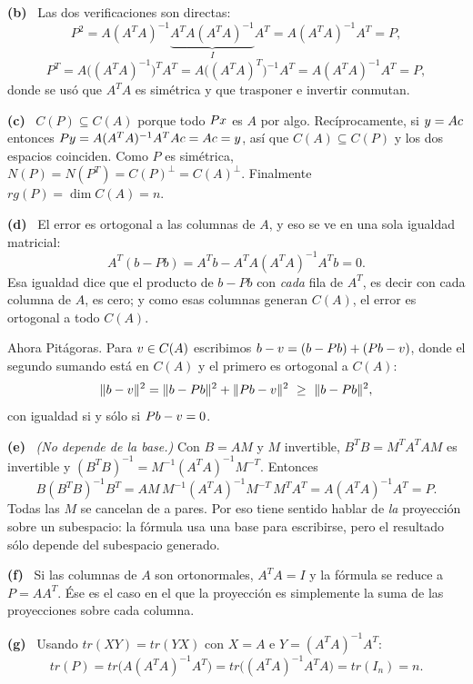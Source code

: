 \documentclass[11pt,a4paper]{article}
\newcommand{\bi}[1]{\boldsymbol{#1}}
\newcommand{\n}[1]{\boldsymbol{#1}}
\newcommand{\bb}{\bi{b}}  \newcommand{\ba}{\bi{a}}  \newcommand{\bz}{\bi{z}}
\DeclareMathOperator{\gen}{span}
\DeclareMathOperator{\tr}{tr}
\DeclareMathOperator{\rg}{rg}
\def\n#1{#1}\def\bi#1{#1}\def\rg{rg}\def\tr{tr}\def\gen{span}%
\newcommand{\itemsol}[1]{\par\medskip\noindent\textbf{(#1)}\ \ignorespaces}
\begin{document}
\itemsol{b} Las dos verificaciones son directas:
\[
P^2=A(A^TA)^{-1}\underbrace{A^TA(A^TA)^{-1}}_{I}A^T=A(A^TA)^{-1}A^T=P,
\]
\[
P^T=A\big((A^TA)^{-1}\big)^TA^T=A\big((A^TA)^T\big)^{-1}A^T=A(A^TA)^{-1}A^T=P,
\]
donde se usó que $A^TA$ es simétrica y que trasponer e invertir conmutan.

\itemsol{c} $C(P)\subseteq C(A)$ porque todo $P\bx$ es $A$ por algo.
Recíprocamente, si $\by=A\bi{c}$ entonces
$P\by=A(A^TA)^{-1}A^TA\bi{c}=A\bi{c}=\by$, así que $C(A)\subseteq C(P)$ y los dos
espacios coinciden. Como $P$ es simétrica, $N(P)=N(P^T)=C(P)^{\perp}=C(A)^{\perp}$.
Finalmente $\rg(P)=\dim C(A)=n$.

\itemsol{d} El error es ortogonal a las columnas de $A$, y eso se ve en una sola
igualdad matricial:
\[
A^T(\bb-P\bb)=A^T\bb-A^TA(A^TA)^{-1}A^T\bb=\n0 .
\]
Esa igualdad dice que el producto de $\bb-P\bb$ con \emph{cada} fila de $A^T$,
es decir con cada columna de $A$, es cero; y como esas columnas generan $C(A)$,
el error es ortogonal a todo $C(A)$.

Ahora Pitágoras. Para $\bv\in C(A)$ escribimos
$\bb-\bv=(\bb-P\bb)+(P\bb-\bv)$, donde el segundo sumando está en $C(A)$ y el
primero es ortogonal a $C(A)$:
\[
\|\bb-\bv\|^2=\|\bb-P\bb\|^2+\|P\bb-\bv\|^2\ \ge\ \|\bb-P\bb\|^2 ,
\]
con igualdad si y sólo si $P\bb-\bv=\n0$.

\itemsol{e} \emph{(No depende de la base.)} Con $B=AM$ y $M$ invertible,
$B^TB=M^TA^TAM$ es invertible y $(B^TB)^{-1}=M^{-1}(A^TA)^{-1}M^{-T}$. Entonces
\[
B(B^TB)^{-1}B^T=AM\,M^{-1}(A^TA)^{-1}M^{-T}\,M^TA^T=A(A^TA)^{-1}A^T=P .
\]
Todas las $M$ se cancelan de a pares. Por eso tiene sentido hablar de
\emph{la} proyección sobre un subespacio: la fórmula usa una base para
escribirse, pero el resultado sólo depende del subespacio generado.

\itemsol{f} Si las columnas de $A$ son ortonormales, $A^TA=I$ y la fórmula se
reduce a $P=AA^T$. Ése es el caso en el que la proyección es simplemente la suma
de las proyecciones sobre cada columna.

\itemsol{g} Usando $\tr(XY)=\tr(YX)$ con $X=A$ e $Y=(A^TA)^{-1}A^T$:
\[
\tr(P)=\tr\big(A(A^TA)^{-1}A^T\big)=\tr\big((A^TA)^{-1}A^TA\big)=\tr(I_n)=n .
\]
\end{document}

